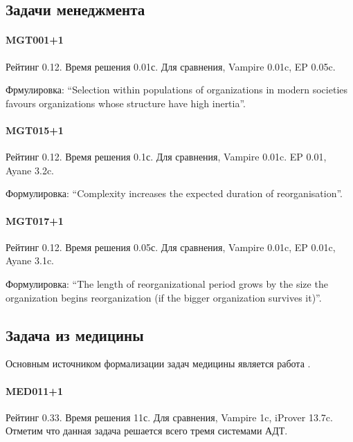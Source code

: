 \subsection{Задачи менеджмента}

\paragraph{MGT001+1}
Рейтинг 0.12. Время решения 0.01с. Для сравнения, Vampire 0.01c, EP 0.05c.

Фрмулировка: ``Selection within populations of organizations in modern societies favours organizations whose structure have high inertia''.

\paragraph{MGT015+1}
Рейтинг 0.12. Время решения 0.1с. Для сравнения, Vampire 0.01c. EP 0.01, Ayane 3.2c.

Формулировка: ``Complexity increases the expected duration of reorganisation''.

\paragraph{MGT017+1}
Рейтинг 0.12. Время решения 0.05с. Для сравнения, Vampire 0.01c, EP 0.01c, Ayane 3.1c.

 Формулировка: ``The length of reorganizational period grows by the size the organization begins reorganization (if the bigger organization survives it)''.



\subsection{Задача из медицины}
Основным источником формализации задач медицины является работа \cite{med1}.

\paragraph{MED011+1}
Рейтинг 0.33. Время решения 11с. Для сравнения, Vampire 1c, iProver 13.7c. Отметим что данная задача решается всего тремя системами АДТ.

